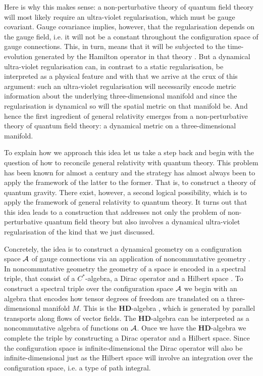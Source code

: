 \documentclass[letterpaper,11pt]{article}
\def\ca{{\cal A}}
\begin{document}
Here is why this makes sense: a non-perturbative theory of quantum field theory will most likely require an ultra-violet regularisation, which must be gauge covariant. Gauge covariance implies, however, that the regularisation depends on the gauge field, i.e. it will not be a constant throughout the configuration space of gauge connections. This, in turn, means that it will be subjected to the time-evolution generated by the Hamilton operator in that theory \cite{Aastrup:2020jcf}. But a dynamical ultra-violet regularisation can, in contrast to a static regularisation, be interpreted as a physical feature and with that we arrive at the crux of this argument: such an ultra-violet regularisation will necessarily encode metric information about the underlying three-dimensional manifold and since the regularisation is dynamical so will the spatial metric on that manifold be. And hence the first ingredient of general relativity emerges from a non-perturbative theory of quantum field theory: a dynamical metric on a three-dimensional manifold.



To explain how we approach this idea let us take a step back and begin with the question of how to reconcile general relativity with quantum theory. This problem has been known for almost a century and the strategy has almost always been to apply the framework of the latter to the former. That is, to construct a theory of quantum gravity. There exist, however, a second logical possibility, which is to apply the framework of general relativity to quantum theory. It turns out that this idea leads to a construction that addresses not only the problem of non-perturbative quantum field theory but also involves a dynamical ultra-violet regularisation of the kind that we just discussed.


Concretely, the idea is to construct a dynamical geometry on a configuration space $\ca$ of gauge connections via an application of noncommutative geometry \cite{Aastrup:2005yk}. In noncommutative geometry the geometry of a space is encoded in a spectral triple, that consist of a $C^*$-algebra, a Dirac operator and a Hilbert space \cite{Connes:2008vs,Connes:1996gi,ConnesBook}. To construct a spectral triple over the configuration space $\ca$ we begin with an algebra that encodes how tensor degrees of freedom are translated on a three-dimensional manifold $M$. This is the $\mathbf{HD}$-algebra \cite{AGnew}, which is generated by parallel transports along flows of vector fields. The $\mathbf{HD}$-algebra can be interpreted as a noncommutative algebra of functions on $\ca$.
Once we have the $\mathbf{HD}$-algebra we complete the triple by constructing a Dirac operator and a Hilbert space. Since the configuration space is infinite-dimensional the Dirac operator will also be infinite-dimensional just as the Hilbert space will involve an integration over the configuration space, i.e. a type of path integral. 
\end{document}
